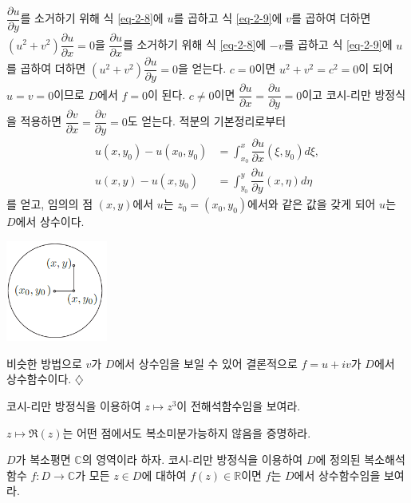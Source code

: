 \begin{saltexample}[label=example-2-11]{}{}
$\dfrac{\partial u}{\partial y}$를 소거하기 위해 식 \eqref{eq-2-8}에 $u$를 곱하고
식 \eqref{eq-2-9}에 $v$를 곱하여 더하면
$(u^2+v^2)\dfrac{\partial u}{\partial x}  = 0$을
$\dfrac{\partial u}{\partial x}$를 소거하기 위해 식 \eqref{eq-2-8}에 $-v$를 곱하고
식 \eqref{eq-2-9}에 $u$를 곱하여 더하면
$(u^2+v^2)\dfrac{\partial u}{\partial y}  = 0$을 얻는다.
$c=0$이면  $u^2+v^2=c^2=0$이 되어 $u=v=0$이므로 $D$에서 $f=0$이 된다.
$c\ne0$이면 $\dfrac{\partial u}{\partial x}= \dfrac{\partial u}{\partial y}=0$이고
코시-리만 방정식을 적용하면 
$\dfrac{\partial v}{\partial x}= \dfrac{\partial v}{\partial y}=0$도 얻는다.
적분의 기본정리로부터 
\begin{align*}
u(x,y_0) - u(x_0, y_0) &= \int_{x_0}^x \dfrac{\partial u}{\partial x}(\xi, y_0)d\xi, \\
u(x,y) - u(x, y_0) &= \int_{y_0}^y \dfrac{\partial u}{\partial y}(x, \eta)d\eta
\end{align*}
를 얻고, 임의의 점 $(x,y)$에서 $u$는 $z_0 = (x_0,y_0)$에서와 같은 값을 갖게 되어
 $u$는 $D$에서 상수이다.

\begin{center}
\includegraphics[width=0.25\textwidth]{./SaltChapter/fig-2-0-3}
\end{center}

비슷한 방법으로 $v$가 $D$에서 상수임을 보일 수 있어
결론적으로 $f=u+iv$가 $D$에서 상수함수이다.
\hfill $\diamondsuit$
\end{saltexample}

\begin{salt_exercise} \label{ex-2-10}
코시-리만 방정식을 이용하여 $z\mapsto z^3$이 전해석함수임을 보여라.
\end{salt_exercise}

\begin{salt_exercise} \label{ex-2-11}
$z\mapsto \Re(z)$는 어떤 점에서도 복소미분가능하지 않음을 증명하라.
\end{salt_exercise}

\begin{salt_exercise} \label{ex-2-12}
$D$가 복소평면 $\mathbb C$의 영역이라 하자.
코시-리만 방정식을 이용하여 
$D$에 정의된 복소해석함수 $f:D\to\mathbb C$가 
모든  $z\in D$에 대하여 $f(z)\in\mathbb R$이면
$f$는 $D$에서 상수함수임을 보여라.
\end{salt_exercise}

